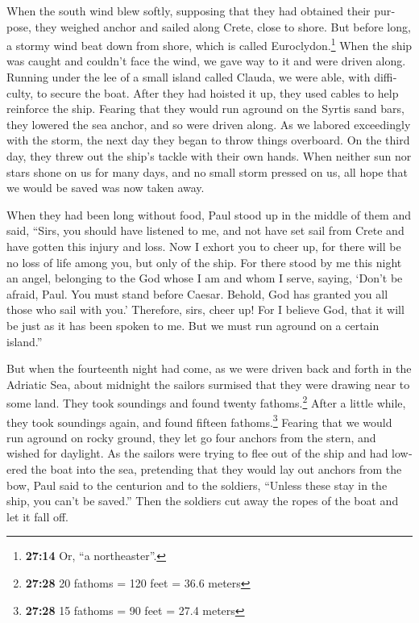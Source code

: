 \begin{paracol}{2}
\begin{otherlanguage}{english}
 When the south wind blew softly, supposing that they had
obtained their purpose, they weighed anchor and sailed along Crete,
close to shore.  But before long, a stormy wind beat down
from shore, which is called Euroclydon.\footnote{\textbf{27:14} Or, ``a
  northeaster''.}  When the ship was caught and couldn't
face the wind, we gave way to it and were driven along. 
Running under the lee of a small island called Clauda, we were able,
with difficulty, to secure the boat.  After they had
hoisted it up, they used cables to help reinforce the ship. Fearing that
they would run aground on the Syrtis sand bars, they lowered the sea
anchor, and so were driven along.  As we labored
exceedingly with the storm, the next day they began to throw things
overboard.  On the third day, they threw out the ship's
tackle with their own hands.  When neither sun nor stars
shone on us for many days, and no small storm pressed on us, all hope
that we would be saved was now taken away.

 When they had been long without food, Paul stood up in
the middle of them and said, ``Sirs, you should have listened to me, and
not have set sail from Crete and have gotten this injury and loss.
 Now I exhort you to cheer up, for there will be no loss
of life among you, but only of the ship.  For there stood
by me this night an angel, belonging to the God whose I am and whom I
serve,  saying, `Don't be afraid, Paul. You must stand
before Caesar. Behold, God has granted you all those who sail with you.'
 Therefore, sirs, cheer up! For I believe God, that it
will be just as it has been spoken to me.  But we must
run aground on a certain island.''

 But when the fourteenth night had come, as we were
driven back and forth in the Adriatic Sea, about midnight the sailors
surmised that they were drawing near to some land.  They
took soundings and found twenty fathoms.\footnote{\textbf{27:28} 20
  fathoms = 120 feet = 36.6 meters} After a little while, they took
soundings again, and found fifteen fathoms.\footnote{\textbf{27:28} 15
  fathoms = 90 feet = 27.4 meters}  Fearing that we would
run aground on rocky ground, they let go four anchors from the stern,
and wished for daylight.  As the sailors were trying to
flee out of the ship and had lowered the boat into the sea, pretending
that they would lay out anchors from the bow,  Paul said
to the centurion and to the soldiers, ``Unless these stay in the ship,
you can't be saved.''  Then the soldiers cut away the
ropes of the boat and let it fall off.


\end{otherlanguage}
\end{paracol}
